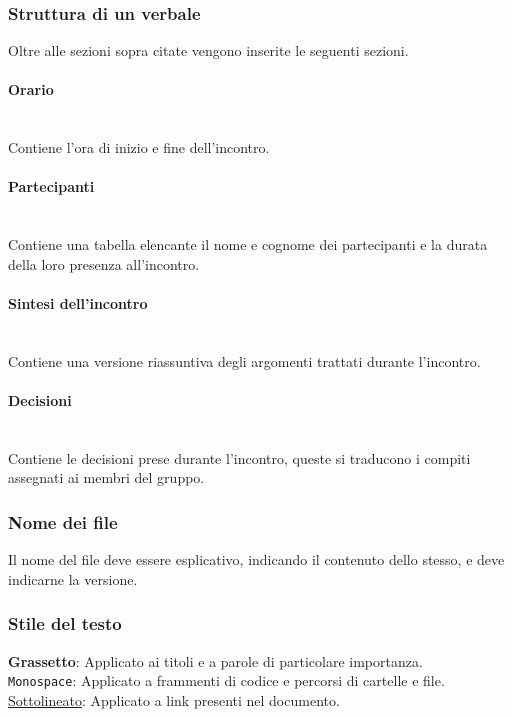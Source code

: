 \documentclass{article}
\begin{document}
\subsubsection{Struttura di un verbale}
Oltre alle sezioni sopra citate vengono inserite le seguenti sezioni.

\paragraph{Orario}~\\
Contiene l'ora di inizio e fine dell'incontro.

\paragraph{Partecipanti}~\\
Contiene una tabella elencante il nome e cognome dei partecipanti e la durata della loro presenza all'incontro.

\paragraph{Sintesi dell'incontro}~\\
Contiene una versione riassuntiva degli argomenti trattati durante l'incontro.

\paragraph{Decisioni}~\\
Contiene le decisioni prese durante l'incontro, queste si traducono i compiti assegnati ai membri del gruppo.

\subsubsection{Nome dei file}
Il nome del file deve essere esplicativo, indicando il contenuto dello stesso, e deve indicarne la versione.

\subsubsection{Stile del testo}
\textbf{Grassetto}: Applicato ai titoli e a parole di particolare importanza. \\
\texttt{Monospace}: Applicato a frammenti di codice e percorsi di cartelle e file. \\
\underline{Sottolineato}: Applicato a link presenti nel documento.
\end{document}
